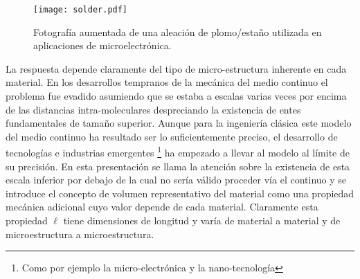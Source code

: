 \documentclass[../notas medios.tex]{subfiles}
\begin{document}
\begin{figure}[H]
\centering
	\texttt{[image: solder.pdf]}
	\caption{Fotografía aumentada de una aleación de plomo/estaño utilizada en aplicaciones de microelectrónica.}
	\label{solder}
\end{figure}

La respuesta depende claramente del tipo de micro-estructura inherente en cada material.  En los desarrollos tempranos de la mecánica del medio continuo el problema fue evadido asumiendo que se estaba a escalas varias veces por encima de las distancias intra-moleculares despreciando la existencia de entes fundamentales de tamaño superior.  Aunque para la ingeniería clásica este modelo del medio continuo ha resultado ser lo suficientemente preciso, el desarrollo de tecnologías e industrias emergentes \footnote{Como por ejemplo la micro-electrónica y la nano-tecnología} ha empezado a llevar al modelo al límite de su precisión.  En esta presentación se llama la atención sobre la existencia de esta escala inferior por debajo de la cual no sería válido proceder vía el continuo y se introduce el concepto de volumen representativo del material como una propiedad mecánica adicional cuyo valor depende de cada material.  Claramente esta propiedad $\ell$ tiene dimensiones de longitud y varía de material a material y de microestructura a microestructura.
\end{document}
